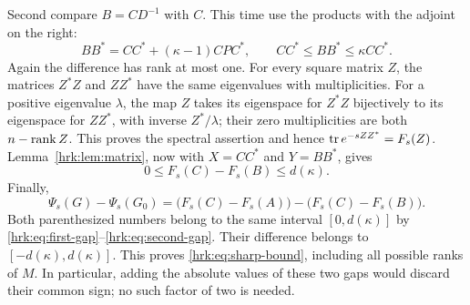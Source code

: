 \documentclass[11pt]{article}
\begin{document}
Second compare $B=CD^{-1}$ with $C$. This time use the products
with the adjoint on the right:
\begin{equation}\label{hrk:eq:right-comparison}
 BB^*=CC^*+(\kappa-1)CPC^*,
 \qquad CC^*\leq BB^*\leq\kappa CC^*.
\end{equation}
Again the difference has rank at most one. For every square matrix
$Z$, the matrices $Z^*Z$ and $ZZ^*$ have the same eigenvalues with
multiplicities. For a positive eigenvalue $\lambda$, the map $Z$
takes its eigenspace for $Z^*Z$ bijectively to its eigenspace for
$ZZ^*$, with inverse $Z^*/\lambda$; their zero multiplicities are
both $n-\operatorname{rank} Z$. This proves the spectral assertion and hence
$\operatorname{tr} e^{-sZZ^*}=F_s(Z)$. Lemma~\ref{hrk:lem:matrix}, now with
$X=CC^*$ and $Y=BB^*$, gives
\begin{equation}\label{hrk:eq:second-gap}
 0\leq F_s(C)-F_s(B)\leq d(\kappa).
\end{equation}
Finally,
\begin{equation}\label{hrk:eq:difference-of-gaps}
 \Psi_s(G)-\Psi_s(G_0)
 =\bigl(F_s(C)-F_s(A)\bigr)
  -\bigl(F_s(C)-F_s(B)\bigr).
\end{equation}
Both parenthesized numbers belong to the same interval
$[0,d(\kappa)]$ by \eqref{hrk:eq:first-gap}--\eqref{hrk:eq:second-gap}.
Their difference belongs to $[-d(\kappa),d(\kappa)]$.
This proves \eqref{hrk:eq:sharp-bound}, including all possible ranks of
$M$. In particular, adding the absolute values of these two gaps
would discard their common sign; no such factor of two is needed.
\end{document}
